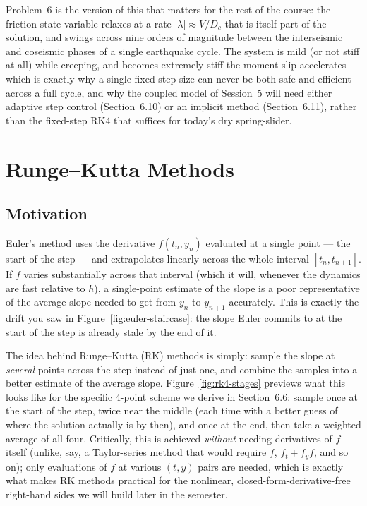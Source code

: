 Problem~6 is the version of this that matters for the rest of the course: the friction state variable relaxes at a rate $|\lambda|\approx V/D_c$ that is itself part of the solution, and swings across nine orders of magnitude between the interseismic and coseismic phases of a single earthquake cycle. The system is mild (or not stiff at all) while creeping, and becomes extremely stiff the moment slip accelerates --- which is exactly why a single fixed step size can never be both safe and efficient across a full cycle, and why the coupled model of Session~5 will need either adaptive step control (Section~6.10) or an implicit method (Section~6.11), rather than the fixed-step RK4 that suffices for today's dry spring-slider.

\section{Runge--Kutta Methods}

\subsection{Motivation}

Euler's method uses the derivative $f(t_n, y_n)$ evaluated at a single point --- the start of the step --- and extrapolates linearly across the whole interval $[t_n, t_{n+1}]$. If $f$ varies substantially across that interval (which it will, whenever the dynamics are fast relative to $h$), a single-point estimate of the slope is a poor representative of the average slope needed to get from $y_n$ to $y_{n+1}$ accurately. This is exactly the drift you saw in Figure~\ref{fig:euler-staircase}: the slope Euler commits to at the start of the step is already stale by the end of it.

The idea behind Runge--Kutta (RK) methods is simply: sample the slope at \emph{several} points across the step instead of just one, and combine the samples into a better estimate of the average slope. Figure~\ref{fig:rk4-stages} previews what this looks like for the specific 4-point scheme we derive in Section~6.6: sample once at the start of the step, twice near the middle (each time with a better guess of where the solution actually is by then), and once at the end, then take a weighted average of all four. Critically, this is achieved \emph{without} needing derivatives of $f$ itself (unlike, say, a Taylor-series method that would require $f$, $f_t + f_y f$, and so on); only evaluations of $f$ at various $(t,y)$ pairs are needed, which is exactly what makes RK methods practical for the nonlinear, closed-form-derivative-free right-hand sides we will build later in the semester.

